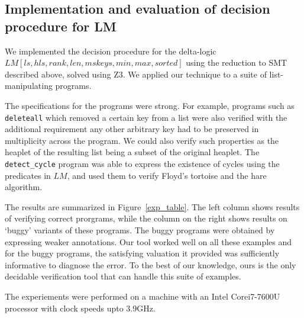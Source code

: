 \subsection{Implementation and evaluation of decision procedure for LM}
\label{sec:experiments}

\begin{sloppypar}We implemented the decision procedure for the delta-logic $LM[ls, hls, rank, len, mskeys, min, max, sorted]$ using the reduction to SMT described above, solved using Z3. We applied our technique to a suite of list-manipulating programs.\end{sloppypar}

The specifications for the programs were strong. For example, programs such as \texttt{deleteall} which removed a certain key from a list were also verified with the additional requirement any other arbitrary key had to be preserved in multiplicity across the program. We could also verify such properties as the heaplet of the resulting list being a subset of the original heaplet. The \texttt{detect\_cycle} program was able to express the existence of cycles using the predicates in $LM$, and used them to verify Floyd's tortoise and the hare algorithm.

The results are summarized in Figure~\ref{exp_table}. The left column shows results of verifying correct prorgrams, while the column on the right shows results on `buggy' variants of these programs. The buggy programs were obtained by expressing weaker annotations. Our tool worked well on all these examples and for the buggy programs, the satisfying valuation it provided was sufficiently informative to diagnose the error. To the best of our knowledge, ours is the only decidable verification tool that can handle this suite of examples.

The experiements were performed on a machine with an Intel\textsuperscript{\textregistered}  Core\texttrademark  i7-7600U processor with clock speeds upto 3.9GHz.